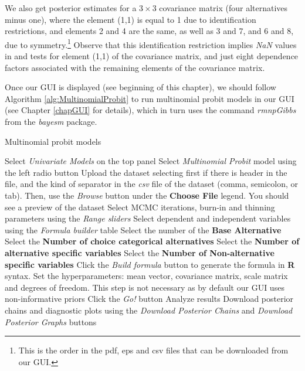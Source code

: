 We also get posterior estimates for a $3\times 3$ covariance matrix (four alternatives minus one), where the element (1,1) is equal to 1 due to identification restrictions, and elements 2 and 4 are the same, as well as 3 and 7, and 6 and 8, due to symmetry.\footnote{This is the order in the pdf, eps and csv files that can be downloaded from our GUI.} Observe that this identification restriction implies \textit{NaN} values in \cite{Geweke1992} and \cite{Heidelberger1983} tests for element (1,1) of the covariance matrix, and just eight dependence factors associated with the remaining elements of the covariance matrix.

Once our GUI is displayed (see beginning of this chapter), we should follow Algorithm \ref{alg:MultinomialProbit} to run multinomial probit models in our GUI (see Chapter \ref{chapGUI} for details), which in turn uses the command \textit{rmnpGibbs} from the \textit{bayesm} package.

\begin{algorithm}[h!]
	\caption{Multinomial probit models}\label{alg:MultinomialProbit}
	\begin{algorithmic}[1]  		 			
		\State Select \textit{Univariate Models} on the top panel
		\State Select \textit{Multinomial Probit} model using the left radio button
		\State Upload the dataset selecting first if there is header in the file, and the kind of separator in the \textit{csv} file of the dataset (comma, semicolon, or tab). Then, use the \textit{Browse} button under the \textbf{Choose File} legend. You should see a preview of the dataset
		\State Select MCMC iterations, burn-in and thinning parameters using the \textit{Range sliders}
		\State Select dependent and independent variables using the \textit{Formula builder} table
		\State Select the number of the \textbf{Base Alternative}
		\State Select the \textbf{Number of choice categorical alternatives}
		\State Select the \textbf{Number of alternative specific variables}
		\State Select the \textbf{Number of Non-alternative specific variables} 
		\State Click the \textit{Build formula} button to generate the formula in \textbf{R} syntax.
		\State Set the hyperparameters: mean vector, covariance matrix, scale matrix and degrees of freedom. This step is not necessary as by default our GUI uses non-informative priors
		\State Click the \textit{Go!} button
		\State Analyze results
		\State Download posterior chains and diagnostic plots using the \textit{Download Posterior Chains} and \textit{Download Posterior Graphs} buttons
	\end{algorithmic} 
\end{algorithm}


